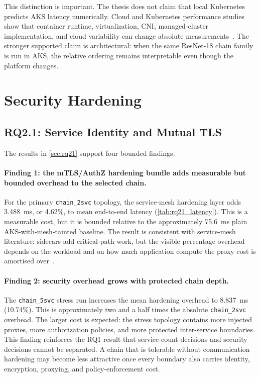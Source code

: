 This distinction is important. The thesis does not claim that local Kubernetes
predicts AKS latency numerically. Cloud and Kubernetes performance studies
show that container runtime, virtualization, CNI, managed-cluster
implementation, and cloud variability can change absolute
measurements~\cite{managed_k8s_perf,virtualization_costs,cni_k8s_ic2e21,
noise_in_clouds}. The stronger supported claim is architectural: when the
same ResNet-18 chain family is run in AKS, the relative ordering remains
interpretable even though the platform changes.

\section{Security Hardening}
\label{sec:analysis-security}

\subsection{RQ2.1: Service Identity and Mutual TLS}
\label{sec:analysis-rq21}

The results in \cref{sec:rq21} support four bounded findings.

\paragraph{Finding 1: the mTLS/AuthZ hardening bundle adds measurable but bounded overhead to the selected chain.}
For the primary \texttt{chain\_2svc} topology, the service-mesh hardening
layer adds 3.488~ms, or 4.62\%, to mean end-to-end latency
(\cref{tab:rq21_latency}). This is a measurable cost, but it is bounded
relative to the approximately 75.6~ms plain AKS-with-mesh-tainted baseline. The result is consistent with service-mesh literature: sidecars
add critical-path work, but the visible percentage overhead depends on the
workload and on how much application compute the proxy cost is amortised
over~\cite{meshinsight_socc23}.

\paragraph{Finding 2: security overhead grows with protected chain depth.}
The \texttt{chain\_5svc} stress run increases the mean hardening overhead to
8.837~ms (10.74\%). This is approximately two and a half times the absolute
\texttt{chain\_2svc} overhead. The larger cost is expected: the stress
topology contains more injected proxies, more authorization policies, and
more protected inter-service boundaries. This finding reinforces the RQ1
result that service-count decisions and security decisions cannot be
separated. A chain that is tolerable without communication hardening may
become less attractive once every boundary also carries identity, encryption,
proxying, and policy-enforcement cost.

